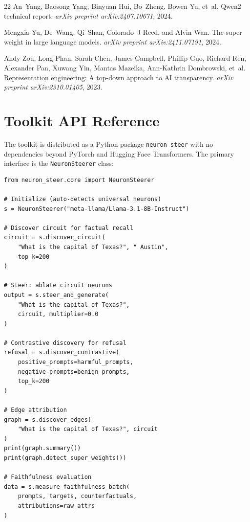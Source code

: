 \documentclass[11pt]{article}
\begin{document}
\begin{thebibliography}{22}
An~Yang, Baosong Yang, Binyuan Hui, Bo~Zheng, Bowen Yu, et~al.
\newblock Qwen2 technical report.
\newblock \emph{arXiv preprint arXiv:2407.10671}, 2024.

Mengxia Yu, De~Wang, Qi~Shan, Colorado~J Reed, and Alvin Wan.
\newblock The super weight in large language models.
\newblock \emph{arXiv preprint arXiv:2411.07191}, 2024.

Andy Zou, Long Phan, Sarah Chen, James Campbell, Phillip Guo, Richard Ren,
  Alexander Pan, Xuwang Yin, Mantas Mazeika, Ann-Kathrin Dombrowski, et~al.
\newblock Representation engineering: A top-down approach to {AI} transparency.
\newblock \emph{arXiv preprint arXiv:2310.01405}, 2023.

\end{thebibliography}

\newpage

\appendix
\section{Toolkit API Reference}
\label{sec:api}

The toolkit is distributed as a Python package \texttt{neuron\_steer} with no dependencies beyond PyTorch and Hugging Face Transformers.
The primary interface is the \texttt{NeuronSteerer} class:

\begin{verbatim}
from neuron_steer.core import NeuronSteerer

# Initialize (auto-detects universal neurons)
s = NeuronSteerer("meta-llama/Llama-3.1-8B-Instruct")

# Discover circuit for factual recall
circuit = s.discover_circuit(
    "What is the capital of Texas?", " Austin",
    top_k=200
)

# Steer: ablate circuit neurons
output = s.steer_and_generate(
    "What is the capital of Texas?",
    circuit, multiplier=0.0
)

# Contrastive discovery for refusal
refusal = s.discover_contrastive(
    positive_prompts=harmful_prompts,
    negative_prompts=benign_prompts,
    top_k=200
)

# Edge attribution
graph = s.discover_edges(
    "What is the capital of Texas?", circuit
)
print(graph.summary())
print(graph.detect_super_weights())

# Faithfulness evaluation
data = s.measure_faithfulness_batch(
    prompts, targets, counterfactuals,
    attributions=raw_attrs
)
\end{verbatim}
\end{document}

